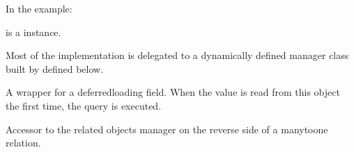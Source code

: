 \documentclass[letterpaper,10pt,english]{sphinxmanual}
\begin{document}
\begin{fulllineitems}
\begin{fulllineitems}
\sphinxAtStartPar
In the example:

\begin{sphinxVerbatim}[commandchars=\\\{\}]
       
\end{sphinxVerbatim}

\sphinxAtStartPar
{} is a  instance.

\sphinxAtStartPar
Most of the implementation is delegated to a dynamically defined manager
class built by  defined below.

\end{fulllineitems}


\begin{fulllineitems}
\label{\detokenize{users:users.models.CustomUser.objects}}
\pysigstartsignatures
\pysigline
{}
\pysigstopsignatures
\end{fulllineitems}


\begin{fulllineitems}
\label{\detokenize{users:users.models.CustomUser.password}}
\pysigstartsignatures
\pysigline
{}
\pysigstopsignatures
\sphinxAtStartPar
A wrapper for a deferred\sphinxhyphen{}loading field. When the value is read from this
object the first time, the query is executed.

\end{fulllineitems}


\begin{fulllineitems}
\label{\detokenize{users:users.models.CustomUser.payment_created_by}}
\pysigstartsignatures
\pysigline
{}
\pysigstopsignatures
\sphinxAtStartPar
Accessor to the related objects manager on the reverse side of a
many\sphinxhyphen{}to\sphinxhyphen{}one relation.


\end{fulllineitems}
\end{fulllineitems}
\end{document}
